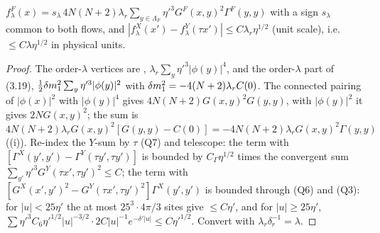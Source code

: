 
\begin{lemma}\label{rot:lem:CK3}
$f^F_\lambda(x)=s_\lambda\,4N(N+2)\lambda_r\sum_{y\in\Lambda_F}\eta'^3G^F(x,y)^2\Gamma^F(y,y)$ with a sign $s_\lambda$ common to both flows, and $|f^X_\lambda(x')-f^Y_\lambda(\tau x')|\le C\lambda_r\eta^{1/2}$ (unit scale), i.e.\ $\le C\lambda\eta^{1/2}$ in physical units.
\end{lemma}
\begin{proof}
The order-$\lambda$ vertices are \cite[(3.18)]{K1}, $\lambda_r\sum_y\eta'^3|\phi(y)|^4$, and the order-$\lambda$ part of (3.19), $\frac12\delta m^2_1\sum_y\eta'^3|\phi(y)|^2$ with $\delta m^2_1=-4(N+2)\lambda_rC(0)$. The connected pairing of $|\phi(x)|^2$ with $|\phi(y)|^4$ gives $4N(N+2)G(x,y)^2G(y,y)$, with $|\phi(y)|^2$ it gives $2NG(x,y)^2$; the sum is $4N(N+2)\lambda_rG(x,y)^2[G(y,y)-C(0)]=-4N(N+2)\lambda_rG(x,y)^2\Gamma(y,y)$ ((i)). Re-index the $Y$-sum by $\tau$ (Q7) and telescope: the term with $[\Gamma^X(y',y')-\Gamma^Y(\tau y',\tau y')]$ is bounded by $C_\Gamma\eta^{1/2}$ times the convergent sum $\sum_{y'}\eta'^3G^Y(\tau x',\tau y')^2\le C$; the term with $[G^X(x',y')^2-G^Y(\tau x',\tau y')^2]\Gamma^X(y',y')$ is bounded through (Q6) and (Q3): for $|u|<25\eta'$ the at most $25^3\cdot4\pi/3$ sites give $\le C\eta'$, and for $|u|\ge25\eta'$, $\sum\eta'^3C_6\eta'^{1/2}|u|^{-3/2}\cdot2C|u|^{-1}e^{-\delta'|u|}\le C\eta'^{1/2}$. Convert with $\lambda_r\delta_r^{-1}=\lambda$.
\end{proof}

